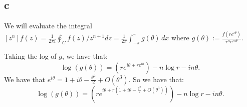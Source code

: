 \documentclass[]{article}
\theoremstyle{definition}
\numberwithin{theorem}{section}
\numberwithin{equation}{section}
\begin{document}
\subsection{c}
We will evaluate the integral $[z^n] f(z) = \frac{1}{2 \pi i }\oint_C f(z)/z^{n + 1} dz =  \frac{1}{2\pi}\int_{-\pi}^{\pi} g(\theta) \, dx$ where $ g(\theta) := \frac{f(r e^{i \theta})}{r^n e^{i n \theta}}$.

Taking the log of $g$, we have that:
\begin{equation}
	\log(g(\theta)) = (r e^{i \theta + r e^{i \theta}}) - n \log r - i n \theta. 
\end{equation}
We have that $e^{i \theta} =  1 + i \theta - \frac{\theta^2}{2} + O(\theta^3)$. So we have that:
\begin{equation}
	\log(g(\theta)) = (r e^{i \theta + r ( 1 + i \theta - \frac{\theta^2}{2} + O(\theta^3))}) - n \log r - i n \theta. 
\end{equation}
\end{document}
